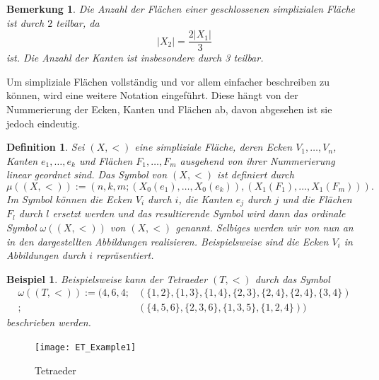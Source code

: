 \documentclass[12pt,titlepage,twoside,cleardoublepage]{article}
\theoremstyle{nummermitklammern}
\newtheorem{bsp}[temp]{Beispiel}
\newtheorem{definition}[temp]{Definition}
\newtheorem{bemerkung}[temp]{Bemerkung}
\newtheorem{definition}[zahl]{Definition}
\newtheorem{bsp}[zahl]{Beispiel}
\newtheorem{bemerkung}[zahl]{Bemerkung}
\numberwithin{equation}{section}
\begin{document}
\begin{bemerkung}
Die Anzahl der Flächen einer geschlossenen simplizialen Fläche ist durch $2$ teilbar, da
\[
\vert X_{2} \vert = \frac{2\vert X_{1}\vert}{3}
\]
ist.
Die Anzahl der Kanten ist insbesondere durch 3 teilbar. 
\end{bemerkung}
Um simpliziale Flächen vollständig und vor allem einfacher beschreiben zu können, wird eine weitere Notation eingeführt. Diese hängt von der Nummerierung der Ecken, Kanten und Flächen ab, davon abgesehen ist sie jedoch eindeutig.
\begin{definition}
 Sei $(X,<)$ eine simpliziale Fläche, deren Ecken $V_{1},\ldots,V_{n}$, Kanten $e_{1},\ldots,e_{k}$ und Flächen $F_{1},\ldots,F_{m}$ ausgehend von ihrer Nummerierung linear geordnet sind. Das \emph{Symbol} von $(X,<)$ ist definiert durch 
\[
\mu((X,<)):=(n,k,m;(X_{0}(e_{1}),\ldots,X_{0}(e_{k})),(X_{1}(F_{1}),\ldots,X_{1}(F_{m}))).
\]
Im Symbol können die Ecken $V_{i}$ durch $i$, die Kanten $e_{j}$ durch $j$ und die Flächen $F_{l}$ durch $l$ ersetzt werden und das resultierende Symbol wird dann das \emph{ordinale Symbol} $\omega((X,<))$ von $(X,<)$ genannt. Selbiges werden wir von nun an in den dargestellten Abbildungen realisieren. Beispielsweise sind die Ecken $V_i$ in Abbildungen durch $i$ repräsentiert. 
\end{definition}
\begin{bsp}
Beispielsweise kann der Tetraeder $(T,<)$ durch das Symbol 
\begin{align*}
\omega ((T,<)):=(4,6,4;&(\{1,2\}, \{1,3\},\{1,4\},\{2,3\},\{2,4\},\{2,4\},\{3,4\})\\
;&(\{4,5,6\},\{2,3,6\},\{1,3,5\},\{1,2,4\}))
\end{align*}
beschrieben werden.
\end{bsp}
\begin{figure}[H]
\begin{center}
\texttt{[image: ET\_Example1]}
\end{center}
\caption{Tetraeder}
\end{figure}
\end{document}
